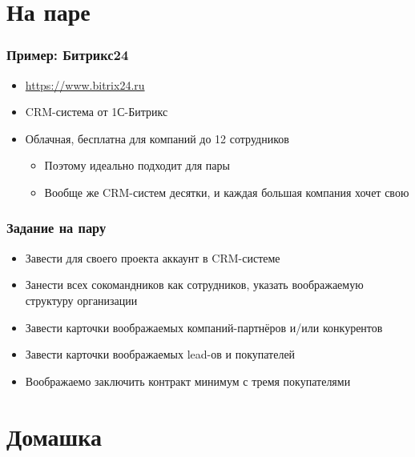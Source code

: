 \documentclass[xetex,mathserif,serif]{beamer}
\begin{document}
	\section{На паре}

	\begin{frame}
		\frametitle{Пример: Битрикс24}
		\begin{itemize}
			\item \url{https://www.bitrix24.ru}
			\item CRM-система от 1С-Битрикс
			\item Облачная, бесплатна для компаний до 12 сотрудников
			\begin{itemize}
				\item Поэтому идеально подходит для пары
				\item Вообще же CRM-систем десятки, и каждая большая компания хочет свою
			\end{itemize}
		\end{itemize}
	\end{frame}

	\begin{frame}
		\frametitle{Задание на пару}
		\begin{itemize}
			\item Завести для своего проекта аккаунт в CRM-системе
			\item Занести всех сокомандников как сотрудников, указать воображаемую структуру организации
			\item Завести карточки воображаемых компаний-партнёров и/или конкурентов
			\item Завести карточки воображаемых lead-ов и покупателей
			\item Воображаемо заключить контракт минимум с тремя покупателями
		\end{itemize}
	\end{frame}

	\section{Домашка}
\end{document}
